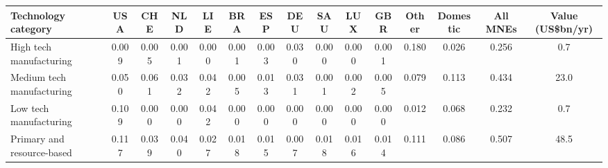 \begin{tabular}{lcccccccccccccc}
\toprule
Technology category & USA & CHE & NLD & LIE & BRA & ESP & DEU & SAU & LUX & GBR & Other & Domestic & All MNEs & Value (US\$bn/yr) \\
\midrule
High tech manufacturing & 0.009 & 0.005 & 0.001 & 0.000 & 0.001 & 0.003 & 0.030 & 0.000 & 0.000 & 0.001 & 0.180 & 0.026 & 0.256 & 0.7 \\
Medium tech manufacturing & 0.050 & 0.061 & 0.032 & 0.042 & 0.005 & 0.013 & 0.031 & 0.001 & 0.002 & 0.005 & 0.079 & 0.113 & 0.434 & 23.0 \\
Low tech manufacturing & 0.109 & 0.000 & 0.000 & 0.042 & 0.000 & 0.000 & 0.000 & 0.000 & 0.000 & 0.000 & 0.012 & 0.068 & 0.232 & 0.7 \\
Primary and resource-based & 0.117 & 0.039 & 0.040 & 0.027 & 0.018 & 0.015 & 0.007 & 0.018 & 0.016 & 0.014 & 0.111 & 0.086 & 0.507 & 48.5 \\
\bottomrule
\end{tabular}
